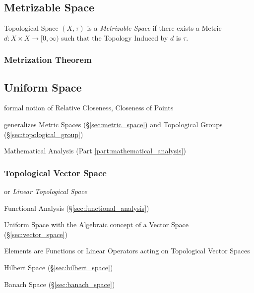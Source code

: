 \subsection{Metrizable Space}\label{sec:metrizable_space}

Topological Space $(X, \tau)$ is a \emph{Metrizable Space} if there
exists a Metric $d : X \times X \rightarrow [0, \infty)$ such that the
  Topology Induced by $d$ is $\tau$.



\subsubsection{Metrization Theorem}\label{sec:metrization_theorem}



\subsection{Uniform Space}\label{sec:uniform_space}

formal notion of Relative Closeness, Closeness of Points

generalizes Metric Spaces (\S\ref{sec:metric_space}) and Topological
Groups (\S\ref{sec:topological_group})

Mathematical Analysis (Part \ref{part:mathematical_analysis})



\subsubsection{Topological Vector Space}\label{sec:topological_vector}

or \emph{Linear Topological Space}

Functional Analysis (\S\ref{sec:functional_analysis})

Uniform Space with the Algebraic concept of a Vector Space
(\S\ref{sec:vector_space})

Elements are Functions or Linear Operators acting on Topological
Vector Spaces

Hilbert Space (\S\ref{sec:hilbert_space})

Banach Space (\S\ref{sec:banach_space})

